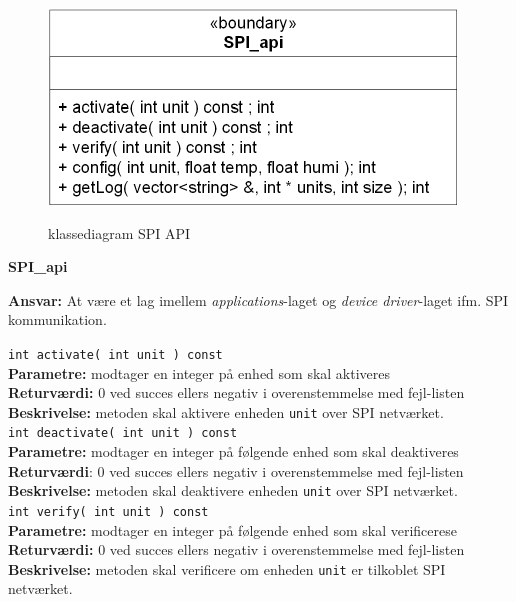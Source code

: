 
\begin{figure}[htbp] \centering
{\includegraphics[scale=1.5]{filer/design/Klassediagrammer/SPI_API}}
\caption{klassediagram SPI API}
\label{fig:SPI API klassediagram}
\end{figure} 

{\centering
\textbf{SPI\_api}\par
}
\textbf{Ansvar:} At være et lag imellem \textit{applications}-laget og \textit{device driver}-laget ifm. SPI kommunikation. \

\verb+int activate( int unit ) const +\\
\textbf{Parametre:} modtager en integer på enhed som skal aktiveres \\
\textbf{Returværdi:} 0 ved succes ellers negativ i overenstemmelse med fejl-listen \\
\textbf{Beskrivelse:} metoden skal aktivere enheden \verb+unit+ over SPI netværket.\\

\verb+int deactivate( int unit ) const+ \\
\textbf{Parametre:}  modtager en integer på følgende enhed som skal deaktiveres\\
\textbf{Returværdi}: 0 ved succes ellers negativ i overenstemmelse med fejl-listen \\
\textbf{Beskrivelse:} metoden skal deaktivere enheden \verb+unit+ over SPI netværket.\\

\verb+int verify( int unit ) const+ \\
\textbf{Parametre:}  modtager en integer på følgende enhed som skal verificerese\\
\textbf{Returværdi:} 0 ved succes ellers negativ i overenstemmelse med fejl-listen   \\
\textbf{Beskrivelse:} metoden skal verificere om enheden \verb+unit+ er tilkoblet SPI netværket.\\

